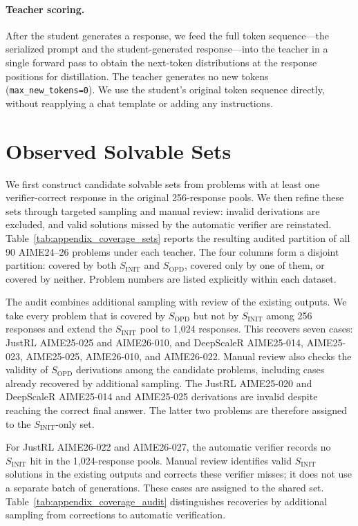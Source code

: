 \paragraph{Teacher scoring.}
After the student generates a response, we feed the full token sequence---the
serialized prompt and the student-generated response---into the teacher in a
single forward pass to obtain the next-token distributions at the response
positions for distillation. The teacher generates no new tokens
(\texttt{max\_new\_tokens=0}). We use the student's original token sequence
directly, without reapplying a chat template or adding any instructions.

\FloatBarrier

\section{Observed Solvable Sets}
\label{app:coverage_records}

We first construct candidate solvable sets from problems with at least one
verifier-correct response in the original 256-response pools. We then refine
these sets through targeted sampling and manual review: invalid derivations
are excluded, and valid solutions missed by the automatic verifier are
reinstated. Table~\ref{tab:appendix_coverage_sets} reports the resulting
audited partition of all 90 AIME24--26 problems under each teacher.
The four columns form a disjoint partition: covered by both
$S_{\mathrm{INIT}}$ and $S_{\mathrm{OPD}}$, covered only by one of them, or
covered by neither. Problem numbers are listed explicitly within each dataset.

The audit combines additional sampling with review of the existing outputs.
We take every problem that is covered
by $S_{\mathrm{OPD}}$ but not by $S_{\mathrm{INIT}}$ among 256 responses and
extend the $S_{\mathrm{INIT}}$ pool to 1,024 responses. This recovers seven
cases: JustRL AIME25-025 and AIME26-010, and DeepScaleR AIME25-014,
AIME25-023, AIME25-025, AIME26-010, and AIME26-022. Manual review also checks the validity of
$S_{\mathrm{OPD}}$ derivations among the candidate problems, including cases
already recovered by additional sampling. The JustRL AIME25-020 and
DeepScaleR AIME25-014 and AIME25-025 derivations are invalid despite reaching
the correct final answer. The latter two problems are therefore assigned to
the $S_{\mathrm{INIT}}$-only set.

For JustRL AIME26-022 and AIME26-027, the automatic verifier records no
$S_{\mathrm{INIT}}$ hit in the 1,024-response pools. Manual review identifies
valid $S_{\mathrm{INIT}}$ solutions in the existing outputs and corrects these
verifier misses; it does not use a separate batch of generations. These cases
are assigned to the shared set.
Table~\ref{tab:appendix_coverage_audit} distinguishes recoveries by additional
sampling from corrections to automatic verification.

